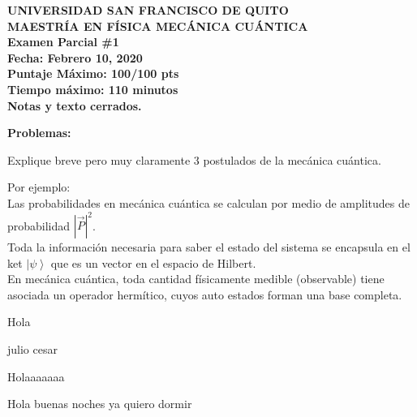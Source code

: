 \documentclass[answers,11pt]{exam}
\newcommand{\abs}[1]{\left| #1 \right|} %
\newcommand{\ket}[1]{\left| #1 \right>} %
\renewcommand{\=}[1]{\stackrel{#1}{=}} %
\theoremstyle{definition}
\theoremstyle{remark}
\begin{document}
\begin{center}
{\bf UNIVERSIDAD SAN FRANCISCO DE QUITO\\
MAESTRÍA EN FÍSICA
MECÁNICA CUÁNTICA \\ 
Examen Parcial \#1 \\ 
Fecha: Febrero 10, 2020 \\
Puntaje Máximo: 100/100 pts\\
Tiempo máximo: 110 minutos \\ 
Notas y texto cerrados.\\
}
\end{center}
\vspace{0.1in}


{\bf Problemas:}\\

\begin{questions}


\question [10] Explique breve pero muy claramente 3 postulados de la
mecánica cuántica.

\begin{solution}
Por ejemplo:\\

Las probabilidades en mecánica cuántica se calculan por medio de amplitudes de probabilidad $\abs {\vec{P}}^{2}$. \\

Toda la información necesaria para saber el estado del sistema se encapsula en el ket $\ket{ \psi}$ que es un vector en el espacio de Hilbert. \\

En mecánica cuántica, toda cantidad físicamente medible (observable) tiene asociada un operador hermítico, cuyos auto estados forman una base completa.\\

\end{solution}


Hola

julio
cesar

Holaaaaaaa


Hola buenas noches ya quiero dormir


\end{questions}
\end{document}
